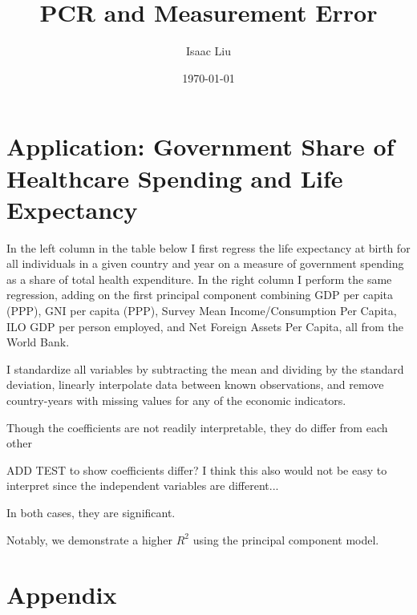 \documentclass{report}
\title{PCR and Measurement Error}
\author{Isaac Liu}
\date{\today}
\begin{document}
	\maketitle

	\newpage \clearpage

    \section*{Application: Government Share of Healthcare Spending and Life Expectancy}

	In the left column in the table below I first regress the life expectancy at birth for all individuals in a given country and year on a measure of government spending as a share of total health expenditure. In the right column I perform the same regression, adding on the first principal component combining GDP per capita (PPP), GNI per capita (PPP), Survey Mean Income/Consumption Per Capita, ILO GDP per person employed, and Net Foreign Assets Per Capita, all from the World Bank.
	
	I standardize all variables by subtracting the mean and dividing by the standard deviation, linearly interpolate data between known observations, and remove country-years with missing values for any of the economic indicators.

    

	Though the coefficients are not readily interpretable, they do differ from each other

	ADD TEST to show coefficients differ? I think this also would not be easy to interpret since the independent variables are different...

	In both cases, they are significant.
	
	Notably, we demonstrate a higher $R^2$ using the principal component model.

    \clearpage \newpage

    \appendix

    \section*{Appendix}
\end{document}
